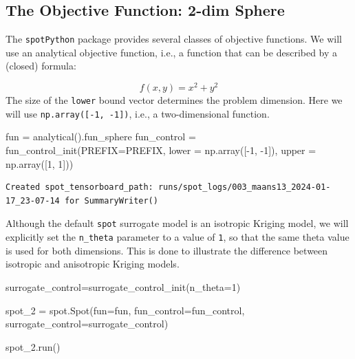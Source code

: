\documentclass[
  letterpaper,
  DIV=11,
  numbers=noendperiod]{scrreprt}
\newenvironment{Shaded}{\begin{snugshade}}{\end{snugshade}}
\newcommand{\DecValTok}[1]{\textcolor[rgb]{0.68,0.00,0.00}{#1}}
\newcommand{\NormalTok}[1]{\textcolor[rgb]{0.00,0.23,0.31}{#1}}
\newcommand{\OperatorTok}[1]{\textcolor[rgb]{0.37,0.37,0.37}{#1}}
\begin{document}
\subsection{The Objective Function: 2-dim
Sphere}\label{the-objective-function-2-dim-sphere}

The \texttt{spotPython} package provides several classes of objective
functions. We will use an analytical objective function, i.e., a
function that can be described by a (closed) formula:

\[
f(x, y) = x^2 + y^2
\] The size of the \texttt{lower} bound vector determines the problem
dimension. Here we will use \texttt{np.array({[}-1,\ -1{]})}, i.e., a
two-dimensional function.

\begin{Shaded}
\begin{Highlighting}[]
\NormalTok{fun }\OperatorTok{=}\NormalTok{ analytical().fun\_sphere}
\NormalTok{fun\_control }\OperatorTok{=}\NormalTok{ fun\_control\_init(PREFIX}\OperatorTok{=}\NormalTok{PREFIX,}
\NormalTok{                               lower }\OperatorTok{=}\NormalTok{ np.array([}\OperatorTok{{-}}\DecValTok{1}\NormalTok{, }\OperatorTok{{-}}\DecValTok{1}\NormalTok{]),}
\NormalTok{                               upper }\OperatorTok{=}\NormalTok{ np.array([}\DecValTok{1}\NormalTok{, }\DecValTok{1}\NormalTok{]))}
\end{Highlighting}
\end{Shaded}

\begin{verbatim}
Created spot_tensorboard_path: runs/spot_logs/003_maans13_2024-01-17_23-07-14 for SummaryWriter()
\end{verbatim}

Although the default \texttt{spot} surrogate model is an isotropic
Kriging model, we will explicitly set the \texttt{n\_theta} parameter to
a value of \texttt{1}, so that the same theta value is used for both
dimensions. This is done to illustrate the difference between isotropic
and anisotropic Kriging models.

\begin{Shaded}
\begin{Highlighting}[]
\NormalTok{surrogate\_control}\OperatorTok{=}\NormalTok{surrogate\_control\_init(n\_theta}\OperatorTok{=}\DecValTok{1}\NormalTok{)}
\end{Highlighting}
\end{Shaded}

\begin{Shaded}
\begin{Highlighting}[]
\NormalTok{spot\_2 }\OperatorTok{=}\NormalTok{ spot.Spot(fun}\OperatorTok{=}\NormalTok{fun,}
\NormalTok{                   fun\_control}\OperatorTok{=}\NormalTok{fun\_control,}
\NormalTok{                   surrogate\_control}\OperatorTok{=}\NormalTok{surrogate\_control)}

\NormalTok{spot\_2.run()}
\end{Highlighting}
\end{Shaded}
\end{document}
